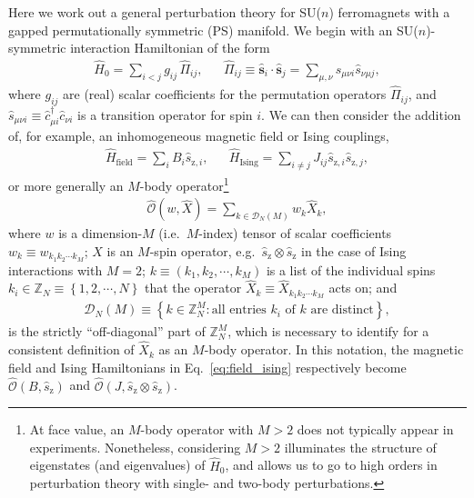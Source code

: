 \documentclass[aps,pra,nofootinbib,twocolumn,superscriptaddress]{revtex4-2}
\renewcommand{\t}{\text} %
\newcommand{\p}[1]{\left(#1\right)} %
\renewcommand{\set}[1]{\left\{#1\right\}} %
\renewcommand{\v}{\bm} %
\newcommand{\1}{\mathds{1}}
\renewcommand{\c}{\hat c}
\newcommand{\s}{\hat s}
\renewcommand{\H}{\hat H}
\renewcommand{\O}{\hat{\mathcal{O}}}
\newcommand{\z}{\text{z}}
\newcommand{\ZZ}{\mathbb{Z}}
\newcommand{\D}{\mathcal{D}}
\begin{document}
Here we work out a general perturbation theory for SU($n$) ferromagnets with a gapped permutationally symmetric (PS) manifold.
We begin with an SU($n$)-symmetric interaction Hamiltonian of the form
\begin{align}
  \H_0 = \sum_{i<j} g_{ij} \, \hat\Pi_{ij},
  &&
  \hat\Pi_{ij} \equiv \v\s_i\cdot\v\s_j
  = \sum_{\mu,\nu} \s_{\mu\nu i} \s_{\nu\mu j},
  \label{eq:H_0}
\end{align}
where $g_{ij}$ are (real) scalar coefficients for the permutation operators $\hat\Pi_{ij}$, and $\s_{\mu\nu i}\equiv \c_{\mu i}^\dag \c_{\nu i}$ is a transition operator for spin $i$.
We can then consider the addition of, for example, an inhomogeneous magnetic field or Ising couplings,
\begin{align}
  \H_{\t{field}} = \sum_i B_i \s_{\z,i},
  &&
  \H_{\t{Ising}} = \sum_{i\ne j} J_{ij} \s_{\z,i} \s_{\z,j},
  \label{eq:field_ising}
\end{align}
or more generally an $M$-body operator\footnote{At face value, an $M$-body operator with $M>2$ does not typically appear in experiments.
Nonetheless, considering $M>2$ illuminates the structure of eigenstates (and eigenvalues) of $\H_0$, and allows us to go to high orders in perturbation theory with single- and two-body perturbations.}
\begin{align}
  \O(w,\hat X) = \sum_{k\in\D_N\p{M}} w_k \hat X_k,
\end{align}
where $w$ is a dimension-$M$ (i.e.~$M$-index) tensor of scalar
coefficients $w_k\equiv w_{k_1k_2\cdots k_M}$; $X$ is an $M$-spin
operator, e.g.~$\s_\z\otimes \s_\z$ in the case of Ising interactions
with $M=2$; $k\equiv\p{k_1,k_2,\cdots,k_M}$ is a list of the
individual spins $k_i\in\ZZ_N\equiv\set{1,2,\cdots,N}$ that the operator $\hat X_k\equiv \hat X_{k_1k_2\cdots k_M}$ acts on; and
\begin{align}
  \D_N\p{M} \equiv
  \set{ k \in \ZZ_N^M : \t{all entries $k_i$ of $k$ are distinct} },
\end{align}
is the strictly ``off-diagonal'' part of $\ZZ_N^M$, which is necessary to identify for a consistent definition of $\hat X_k$ as an $M$-body operator.
In this notation, the magnetic field and Ising Hamiltonians in Eq.~\eqref{eq:field_ising} respectively become $\O\p{B,\s_{\z}}$ and $\O\p{J,\s_\z\otimes \s_\z}$.
\end{document}
